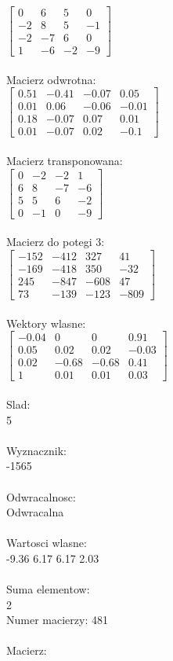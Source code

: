 \documentclass[a4paper,12pt]{article}
\begin{document}
$\begin{bmatrix} 0&6&5&0\\-2&8&5&-1\\-2&-7&6&0\\1&-6&-2&-9 \end{bmatrix}$
\\
\\
Macierz odwrotna:\\

$\begin{bmatrix} 0.51&-0.41&-0.07&0.05\\0.01&0.06&-0.06&-0.01\\0.18&-0.07&0.07&0.01\\0.01&-0.07&0.02&-0.1 \end{bmatrix}$
\\
\\
Macierz transponowana:\\

$\begin{bmatrix} 0&-2&-2&1\\6&8&-7&-6\\5&5&6&-2\\0&-1&0&-9 \end{bmatrix}$
\\
\\
Macierz do potegi 3:\\

$\begin{bmatrix} -152&-412&327&41\\-169&-418&350&-32\\245&-847&-608&47\\73&-139&-123&-809 \end{bmatrix}$
\\
\\
Wektory wlasne:\\

$\begin{bmatrix} -0.04&0&0&0.91\\0.05&0.02&0.02&-0.03\\0.02&-0.68&-0.68&0.41\\1&0.01&0.01&0.03 \end{bmatrix}$
\\
\\
Slad:\\
5
\\
\\
Wyznacznik:\\
-1565
\\
\\
Odwracalnosc:\\
Odwracalna
\\
\\
Wartosci wlasne:\\
-9.36 6.17 6.17 2.03
\\
\\
Suma elementow:\\
2
\\
\newpage
Numer macierzy:
481
\\
\\
Macierz:\\
\end{document}
